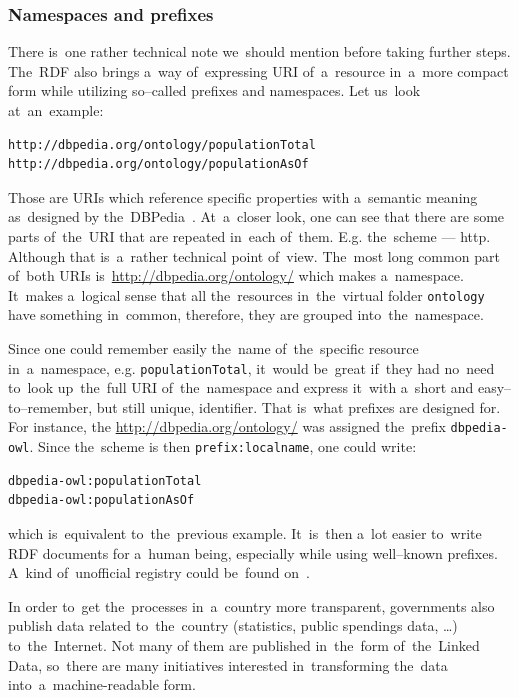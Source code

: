 \subsubsection{Namespaces and prefixes}

There is~one rather technical note we~should mention before taking further steps. The~RDF
also brings a~way of~expressing URI of~a~resource in~a~more compact form while utilizing
so--called prefixes and namespaces. Let us~look at~an~example:

\scriptsize\begin{verbatim}
http://dbpedia.org/ontology/populationTotal
http://dbpedia.org/ontology/populationAsOf
\end{verbatim}\normalsize

Those are URIs which reference specific properties with a~semantic meaning as~designed
by the~DBPedia~\cite{dbpedia}. At~a~closer look, one can see that there are some parts of~the~URI
that are repeated in~each of~them. E.g. the~scheme --- http. Although that is~a~rather technical
point of~view. The~most long common part of~both URIs is~\url{http://dbpedia.org/ontology/}
which makes a~namespace. It~makes a~logical sense that all the~resources in~the~virtual
folder \texttt{ontology} have something in~common, therefore, they are grouped into~the~namespace.

Since one could remember easily the~name of~the~specific resource in~a~namespace,
e.g. \texttt{populationTotal}, it~would be~great if~they had no~need to~look up~the~full
URI of~the~namespace and express it~with a~short and easy--to--remember, but still 
unique, identifier. That is~what prefixes are designed for. For instance, the
\url{http://dbpedia.org/ontology/} was assigned the~prefix \texttt{dbpedia-owl}. Since the~scheme
is then \texttt{prefix:localname}, one could write:

\scriptsize\begin{verbatim}
dbpedia-owl:populationTotal
dbpedia-owl:populationAsOf
\end{verbatim}\normalsize

which is~equivalent to~the~previous example. It~is~then a~lot easier to~write RDF
documents for a~human being, especially while using well--known prefixes. A~kind of~unofficial
registry could be~found on~\cite{prefixcc}.

In order to~get the~processes in~a~country more transparent, governments also publish data
related to~the~country (statistics, public spendings data, …) to~the~Internet. Not many of
them are published in~the~form of~the~Linked Data, so~there are many initiatives
interested in~transforming the~data into~a~machine-readable form.

